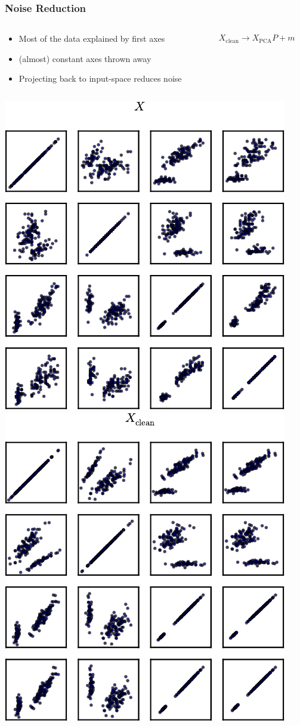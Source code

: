\begin{frame}[fragile]
  \frametitle{Noise Reduction}
  \begin{columns}
      \begin{column}{.7\linewidth}
          \begin{itemize}
              \item Most of the data explained by first axes
              \item (almost) constant axes thrown away
              \item Projecting back to input-space reduces noise
          \end{itemize}
      \end{column}
      \begin{column}{.3\linewidth}
          \begin{align*}
              X_{\mathrm{clean}} \rightarrow X_{\mathrm{PCA}} P + m 
          \end{align*}
      \end{column}
  \end{columns}
  \begin{center}
    \includegraphics[width=.40\linewidth]{pca-pics/iris-all-nocolor}\hfill%
    \includegraphics[width=.40\linewidth]{pca-pics/iris-bt-nocolor}
  \end{center}
\end{frame}


